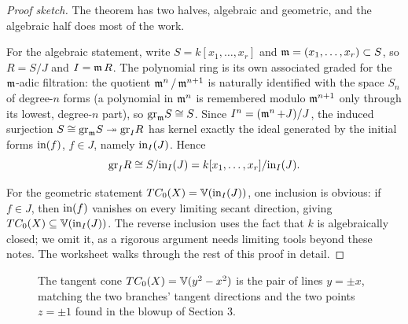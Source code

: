 \documentclass[12pt]{amsproc}
\begin{document}
\begin{proof}[Proof sketch]
    The theorem has two halves, algebraic and geometric, and the algebraic half  does most of the work.

    For the algebraic statement, write $S = k[x_1, \ldots, x_r]$ and 
    $\operatorname{\mathfrak{m}} = (x_1, \ldots, x_r) \subset S$, so $R = S/J$ and $I = \operatorname{\mathfrak{m}} R$. The polynomial ring is its own associated graded for the $\operatorname{\mathfrak{m}}$-adic 
    filtration: the quotient $\operatorname{\mathfrak{m}}^n/\operatorname{\mathfrak{m}}^{n+1}$ is naturally identified with the 
    space $S_n$ of degree-$n$ forms (a polynomial in $\operatorname{\mathfrak{m}}^n$ is remembered modulo 
    $\operatorname{\mathfrak{m}}^{n+1}$ only through its lowest, degree-$n$ part), so $\text{gr}_{\operatorname{\mathfrak{m}}} S \cong S$.
    Since $I^n = (\operatorname{\mathfrak{m}}^n + J)/J$, the induced surjection  $S \cong \text{gr}_{\operatorname{\mathfrak{m}}} S \twoheadrightarrow \text{gr}_I R$ has kernel exactly the ideal 
    generated by the initial forms $\text{in}(f)$, $f \in J$, namely $\text{in}_I(J)$. 
    Hence
    \[\text{gr}_I R \cong S/\text{in}_I(J) = k[x_1, \ldots, x_r]/\text{in}_I(J).\]

    For the geometric statement $TC_0(X) = \mathbb V(\text{in}_I(J))$, one inclusion is obvious: if $f \in J$, then $\text{in}(f)$ vanishes on every limiting secant direction, giving $TC_0(X) \subseteq \mathbb V(\text{in}_I(J))$. The reverse inclusion uses the fact that $k$ is algebraically closed; we omit 
    it, as a rigorous argument needs limiting tools beyond these notes. The worksheet walks through the rest of this proof in detail. 
\end{proof}

\begin{figure}
    \centering
    \caption{\footnotesize The tangent cone $TC_0(X) = \mathbb V(y^2 - x^2)$ is the pair of lines $y = \pm x$, matching the two branches' 
    tangent directions and the two points $z = \pm 1$ found in the blowup 
    of Section 3.}
\end{figure}
\end{document}
